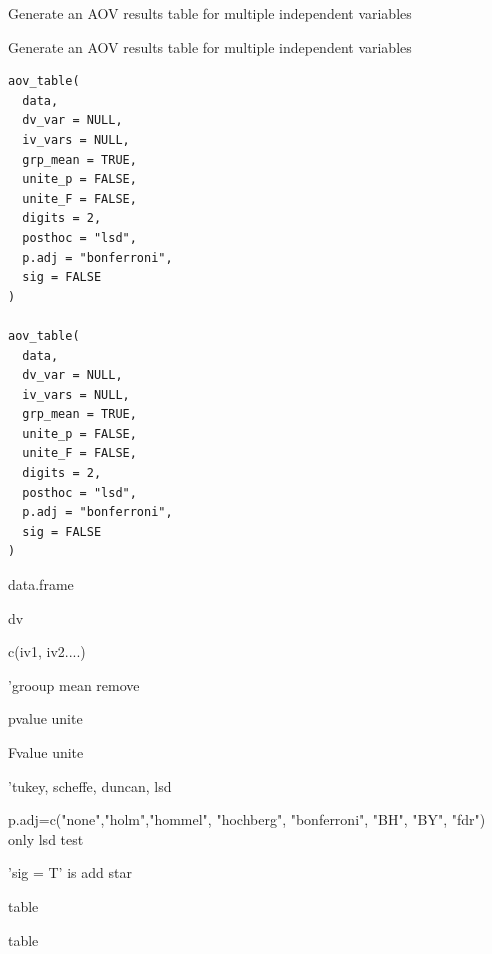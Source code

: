 \documentclass[a4paper]{book}
\begin{document}
%
\begin{Description}
Generate an AOV results table for multiple independent variables

Generate an AOV results table for multiple independent variables
\end{Description}
%
\begin{Usage}
\begin{verbatim}
aov_table(
  data,
  dv_var = NULL,
  iv_vars = NULL,
  grp_mean = TRUE,
  unite_p = FALSE,
  unite_F = FALSE,
  digits = 2,
  posthoc = "lsd",
  p.adj = "bonferroni",
  sig = FALSE
)

aov_table(
  data,
  dv_var = NULL,
  iv_vars = NULL,
  grp_mean = TRUE,
  unite_p = FALSE,
  unite_F = FALSE,
  digits = 2,
  posthoc = "lsd",
  p.adj = "bonferroni",
  sig = FALSE
)
\end{verbatim}
\end{Usage}
%
\begin{Arguments}
\begin{ldescription}
\item[\code{data}] data.frame

\item[\code{dv\_var}] dv

\item[\code{iv\_vars}] c(iv1, iv2....)

\item[\code{grp\_mean}] 'grooup mean remove

\item[\code{unite\_p}] pvalue unite

\item[\code{unite\_F}] Fvalue unite

\item[\code{posthoc}] 'tukey, scheffe, duncan, lsd

\item[\code{p.adj}] p.adj=c("none","holm","hommel", "hochberg", "bonferroni", "BH", "BY", "fdr") only lsd test

\item[\code{sig}] 'sig = T' is add star
\end{ldescription}
\end{Arguments}
%
\begin{Value}
table

table
\end{Value}
%
\end{document}

